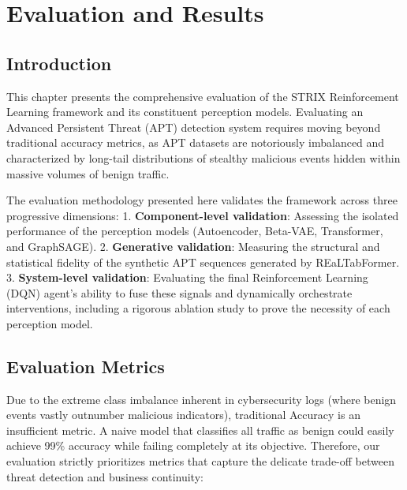\chapter{Evaluation and Results}
\label{chap:evaluation}


\section{Introduction}
\label{sec:results_intro}

This chapter presents the comprehensive evaluation of the STRIX Reinforcement Learning framework and its constituent perception models. Evaluating an Advanced Persistent Threat (APT) detection system requires moving beyond traditional accuracy metrics, as APT datasets are notoriously imbalanced and characterized by long-tail distributions of stealthy malicious events hidden within massive volumes of benign traffic. 

The evaluation methodology presented here validates the framework across three progressive dimensions:
1. \textbf{Component-level validation}: Assessing the isolated performance of the perception models (Autoencoder, Beta-VAE, Transformer, and GraphSAGE).
2. \textbf{Generative validation}: Measuring the structural and statistical fidelity of the synthetic APT sequences generated by REaLTabFormer.
3. \textbf{System-level validation}: Evaluating the final Reinforcement Learning (DQN) agent's ability to fuse these signals and dynamically orchestrate interventions, including a rigorous ablation study to prove the necessity of each perception model.


\section{Evaluation Metrics}
\label{sec:eval_metrics}

Due to the extreme class imbalance inherent in cybersecurity logs (where benign events vastly outnumber malicious indicators), traditional Accuracy is an insufficient metric. A naive model that classifies all traffic as benign could easily achieve 99\% accuracy while failing completely at its objective. Therefore, our evaluation strictly prioritizes metrics that capture the delicate trade-off between threat detection and business continuity:

